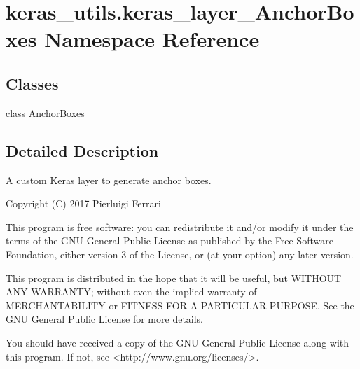 \hypertarget{namespacekeras__utils_1_1keras__layer___anchor_boxes}{}\section{keras\+\_\+utils.\+keras\+\_\+layer\+\_\+\+Anchor\+Boxes Namespace Reference}
\label{namespacekeras__utils_1_1keras__layer___anchor_boxes}
\subsection*{Classes}
\begin{DoxyCompactItemize}
\item 
class \hyperlink{classkeras__utils_1_1keras__layer___anchor_boxes_1_1_anchor_boxes}{Anchor\+Boxes}
\end{DoxyCompactItemize}


\subsection{Detailed Description}
\begin{DoxyVerb}A custom Keras layer to generate anchor boxes.

Copyright (C) 2017 Pierluigi Ferrari

This program is free software: you can redistribute it and/or modify
it under the terms of the GNU General Public License as published by
the Free Software Foundation, either version 3 of the License, or
(at your option) any later version.

This program is distributed in the hope that it will be useful,
but WITHOUT ANY WARRANTY; without even the implied warranty of
MERCHANTABILITY or FITNESS FOR A PARTICULAR PURPOSE.  See the
GNU General Public License for more details.

You should have received a copy of the GNU General Public License
along with this program.  If not, see <http://www.gnu.org/licenses/>.
\end{DoxyVerb}
 